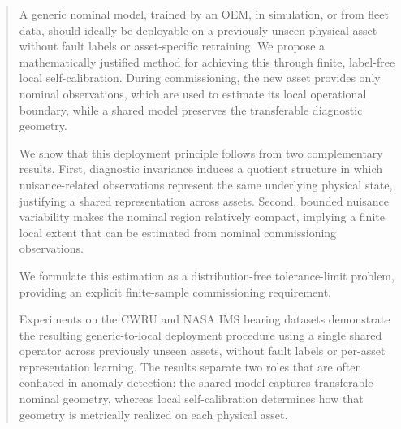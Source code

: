 \documentclass[a4paper]{cas-sc}
\begin{document}
\begin{abstract}
A generic nominal model, trained by an OEM, in simulation, or from fleet data,
should ideally be deployable on a previously unseen physical asset without fault
labels or asset-specific retraining. We propose a mathematically justified method
for achieving this through finite, label-free local self-calibration. During
commissioning, the new asset provides only nominal observations, which are used
to estimate its local operational boundary, while a shared model preserves the
transferable diagnostic geometry.

We show that this deployment principle follows from two complementary results.
First, diagnostic invariance induces a quotient structure in which
nuisance-related observations represent the same underlying physical state,
justifying a shared representation across assets. Second, bounded nuisance
variability makes the nominal region relatively compact, implying a finite local
extent that can be estimated from nominal commissioning observations.

We formulate this estimation as a distribution-free tolerance-limit problem,
providing an explicit finite-sample commissioning requirement. 

Experiments on the CWRU and NASA IMS bearing datasets demonstrate the resulting
generic-to-local deployment procedure using a single shared operator across
previously unseen assets, without fault labels or per-asset representation
learning. The results separate two roles that are often conflated in anomaly
detection: the shared model captures transferable nominal geometry, whereas
local self-calibration determines how that geometry is metrically realized on
each physical asset. 

\end{abstract}
\end{document}
